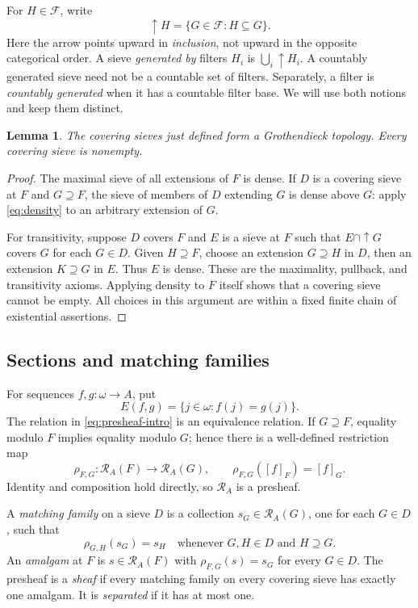 \documentclass[11pt,letterpaper]{article}
\newtheorem{lemma}[theorem]{Lemma}
\theoremstyle{definition}
\theoremstyle{remark}
\newcommand{\om}{\omega}
\newcommand{\cF}{\mathcal F}
\newcommand{\RA}{\mathscr R_A}
\newcommand{\eqset}[2]{E(#1,#2)}
\begin{document}
For $H\in\cF$, write
\[
 \uparrow H=\{G\in\cF:H\subseteq G\}.
\]
Here the arrow points upward in \emph{inclusion}, not upward in the
opposite categorical order. A sieve \emph{generated by} filters $H_i$
is $\bigcup_i\uparrow H_i$. A countably generated sieve need not be a
countable set of filters. Separately, a filter is \emph{countably generated}
when it has a countable filter base. We will use both notions and keep
them distinct.

\begin{lemma}\label{lem:topology}
The covering sieves just defined form a Grothendieck topology.
Every covering sieve is nonempty.
\end{lemma}
\begin{proof}
The maximal sieve of all extensions of $F$ is dense. If $D$ is a covering
sieve at $F$ and $G\supseteq F$, the sieve of members of $D$ extending
$G$ is dense above $G$: apply \eqref{eq:density} to an arbitrary
extension of $G$.

For transitivity, suppose $D$ covers $F$ and $E$ is a sieve at $F$ such
that $E\cap\uparrow G$ covers $G$ for each $G\in D$. Given $H\supseteq F$,
choose an extension $G\supseteq H$ in $D$, then an extension
$K\supseteq G$ in $E$. Thus $E$ is dense. These are the maximality,
pullback, and transitivity axioms. Applying density to $F$ itself shows
that a covering sieve cannot be empty. All choices in this argument are
within a fixed finite chain of existential assertions.
\end{proof}

\subsection{Sections and matching families}
For sequences $f,g:\om\to A$, put
\[
 \eqset{f}{g}=\{j\in\om:f(j)=g(j)\}.
\]
The relation in \eqref{eq:presheaf-intro} is an equivalence relation.
If $G\supseteq F$, equality modulo $F$ implies equality modulo $G$;
hence there is a well-defined restriction map
\[
 \rho_{F,G}:\RA(F)\longrightarrow\RA(G),\qquad
 \rho_{F,G}([f]_F)=[f]_G.
\]
Identity and composition hold directly, so $\RA$ is a presheaf.

A \emph{matching family} on a sieve $D$ is a collection
$s_G\in\RA(G)$, one for each $G\in D$, such that
\[
 \rho_{G,H}(s_G)=s_H\quad\text{whenever }G,H\in D\text{ and }H\supseteq G.
\]
An \emph{amalgam} at $F$ is $s\in\RA(F)$ with
$\rho_{F,G}(s)=s_G$ for every $G\in D$. The presheaf is a \emph{sheaf}
if every matching family on every covering sieve has exactly one amalgam.
It is \emph{separated} if it has at most one.
\end{document}
